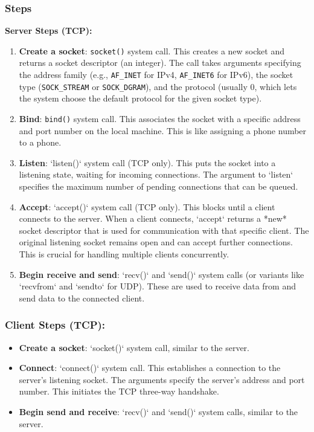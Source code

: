 \subsubsection{Steps}
\textbf{Server Steps (TCP):}
\begin{enumerate}[itemsep=1pt]
    \item \textbf{Create a socket}: \texttt{socket()} system call.  This creates a new socket and returns a socket descriptor (an integer).  The call takes arguments specifying the address family (e.g., \texttt{AF\_INET} for IPv4, \texttt{AF\_INET6} for IPv6), the socket type (\texttt{SOCK\_STREAM} or \texttt{SOCK\_DGRAM}), and the protocol (usually 0, which lets the system choose the default protocol for the given socket type).
    \item \textbf{Bind}: \texttt{bind()} system call.  This associates the socket with a specific address and port number on the local machine.  This is like assigning a phone number to a phone.
    \item \textbf{Listen}: `listen()` system call (TCP only).  This puts the socket into a listening state, waiting for incoming connections.  The argument to `listen` specifies the maximum number of pending connections that can be queued.
    \item \textbf{Accept}: `accept()` system call (TCP only).  This blocks until a client connects to the server.  When a client connects, `accept` returns a *new* socket descriptor that is used for communication with that specific client. The original listening socket remains open and can accept further connections. This is crucial for handling multiple clients concurrently.
    \item \textbf{Begin receive and send}:  `recv()` and `send()` system calls (or variants like `recvfrom` and `sendto` for UDP). These are used to receive data from and send data to the connected client.
\end{enumerate}

\subsubsection{Client Steps (TCP):}
\begin{itemize}[itemsep=1pt]
    \item \textbf{Create a socket}: `socket()` system call, similar to the server.
    \item \textbf{Connect}: `connect()` system call.  This establishes a connection to the server's listening socket.  The arguments specify the server's address and port number.  This initiates the TCP three-way handshake.
    \item \textbf{Begin send and receive}: `recv()` and `send()` system calls, similar to the server.
\end{itemize}

